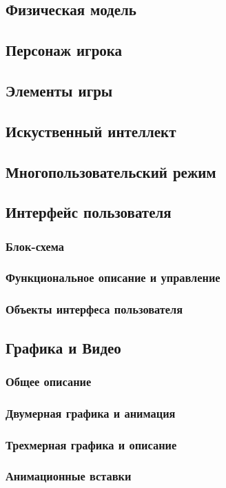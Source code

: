 \documentclass[article,12pt, fleqn]{article}
\begin{document}
\begin{itemize}
\subsection{Физическая модель}
\subsection{Персонаж игрока}
\subsection{Элементы игры}
\subsection{Искуственный интеллект}
\subsection{Многопользовательский режим}
\subsection{Интерфейс пользователя}
\subsubsection{Блок-схема}
\subsubsection{Функциональное описание и управление}
\subsubsection{Объекты интерфеса пользователя}
\subsection{Графика и Видео}
\subsubsection{Общее описание}
\subsubsection{Двумерная графика и анимация}
\subsubsection{Трехмерная графика и описание}
\subsubsection{Анимационные вставки}

\end{itemize}
\end{document}
